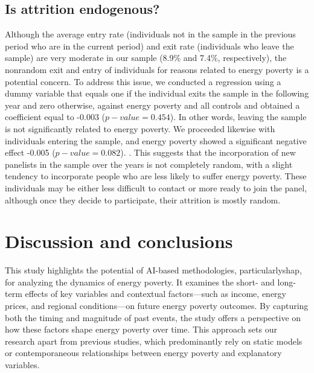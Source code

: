 \documentclass[preprint,authoryear,12pt]{elsarticle}
\begin{document}
\subsection{Is attrition endogenous?}

Although the average entry rate (individuals not in the sample in the previous period who are in the current period) and exit rate (individuals who leave the sample) are very moderate in our sample (8.9\% and 7.4\%, respectively), the nonrandom exit and entry of individuals for reasons related to energy poverty is a potential concern. To address this issue, we conducted a regression using a dummy variable that equals one if the individual exits the sample in the following year and zero otherwise, against energy poverty and all controls and obtained a coefficient equal to -0.003 ($p -value = 0.454$). In other words, leaving the sample is not significantly related to energy poverty. We proceeded likewise with individuals entering the sample, and energy poverty showed a significant negative effect -0.005 ($p -value = 0.082$). . This suggests that the incorporation of new panelists in the sample over the years is not completely random, with a slight tendency to incorporate people who are less likely to suffer energy poverty. These individuals may be either less difficult to contact or more ready to join the panel, although once they decide to participate, their attrition is mostly random.

\section{Discussion and conclusions} \label{Conclusions}

This study highlights the potential of AI-based methodologies, particularly\Gls{shap}, for analyzing the dynamics of energy poverty. It examines the short- and long-term effects of key variables and contextual factors—such as income, energy prices, and regional conditions—on future energy poverty outcomes. By capturing both the timing and magnitude of past events, the study offers a perspective on how these factors shape energy poverty over time. This approach sets our research apart from previous studies, which predominantly rely on static models or contemporaneous relationships between energy poverty and explanatory variables. 
\end{document}
